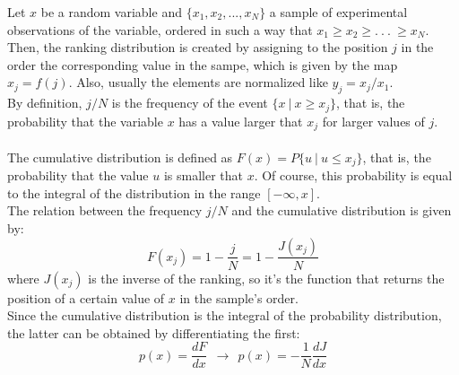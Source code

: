 Let $x$ be a random variable and $\{x_1,x_2, . . . , x_N\}$ a sample of experimental observations of the variable, ordered in such a way that $x_1 \geq x_2 \geq . \ . \ . \ \geq x_N$. \\ 
Then, the ranking distribution is created by assigning to the position $j$ in the order the corresponding value in the sampe, which is given by the map $x_j = f(j)$. Also, usually the elements are normalized like $y_j = x_j/x_1$. \\ 
By definition, $j/N$ is the frequency of the event $\{x \ | \ x \geq x_j \}$, that is, the probability that the variable $x$ has a value larger that $x_j$ for larger values of $j$. \\ \\
The cumulative distribution is defined as $F(x) = P\{u \ | \ u \leq x_j\}$, that is, the probability that the value $u$ is smaller that $x$. Of course, this probability is equal to the integral of the distribution in the range $[-\infty,x]$. \\
The relation between the frequency $j/N$ and the cumulative distribution is given by:
$$
	F(x_j) = 1 - \frac{j}{N} = 1 - \frac{J(x_j)}{N}
$$
where $J(x_j)$ is the inverse of the ranking, so it's the function that returns the position of a certain value of $x$ in the sample's order. \\
Since the cumulative distribution is the integral of the probability distribution, the latter can be obtained by differentiating the first:
$$
	p(x) = \frac{dF}{dx} \ \ \longrightarrow \ \ p(x) = -\frac{1}{N} \frac{dJ}{dx}
$$
